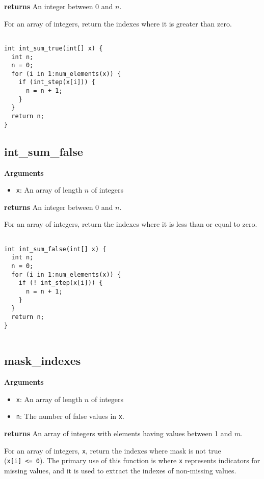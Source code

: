 \documentclass[]{book}
\providecommand{\tightlist}{%
  \setlength{\itemsep}{0pt}\setlength{\parskip}{0pt}}
\begin{document}
\textbf{returns} An integer between 0 and \(n\).

For an array of integers, return the indexes where it is greater than
zero.

\begin{verbatim}

int int_sum_true(int[] x) {
  int n;
  n = 0;
  for (i in 1:num_elements(x)) {
    if (int_step(x[i])) {
      n = n + 1;
    }
  }
  return n;
}

\end{verbatim}

\subsection{int\_sum\_false}\label{int_sum_false}

\textbf{Arguments}

\begin{itemize}
\tightlist
\item
  \texttt{x}: An array of length \(n\) of integers
\end{itemize}

\textbf{returns} An integer between 0 and \(n\).

For an array of integers, return the indexes where it is less than or
equal to zero.

\begin{verbatim}

int int_sum_false(int[] x) {
  int n;
  n = 0;
  for (i in 1:num_elements(x)) {
    if (! int_step(x[i])) {
      n = n + 1;
    }
  }
  return n;
}


\end{verbatim}

\subsection{mask\_indexes}\label{mask_indexes}

\textbf{Arguments}

\begin{itemize}
\tightlist
\item
  \texttt{x}: An array of length \(n\) of integers
\item
  \texttt{n}: The number of false values in \texttt{x}.
\end{itemize}

\textbf{returns} An array of integers with elements having values
between 1 and \(m\).

For an array of integers, \texttt{x}, return the indexes where mask is
not true (\texttt{x{[}i{]}\ \textless{}=\ 0}). The primary use of this
function is where \texttt{x} represents indicators for missing values,
and it is used to extract the indexes of non-missing values.
\end{document}
